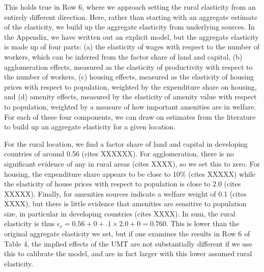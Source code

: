 \documentclass[10pt]{article}
\begin{document}
This holds true in Row 6, where we approach setting the rural elasticity from an entirely different direction. Here, rather than starting with an aggregate estimate of the elasticity, we build up the aggregate elasticity from underlying sources. In the Appendix, we have written out an explicit model, but the aggregate elasticity is made up of four parts: (a) the elasticity of wages with respect to the number of workers, which can be inferred from the factor share of land and capital, (b) agglomeration effects, measured as the elasticity of productivity with respect to the number of workers, (c) housing effects, measured as the elasticity of housing prices with respect to population, weighted by the expenditure share on housing, and (d) amenity effects, measured by the elasticity of amenity value with respect to population, weighted by a measure of how important amenities are in welfare. For each of these four components, we can draw on estimates from the literature to build up an aggregate elasticity for a given location.

For the rural location, we find a factor share of land and capital in developing countries of around 0.56 (cites XXXXXX). For agglomeration, there is no significant evidence of any in rural areas (cites XXXX), so we set this to zero. For housing, the expenditure share appears to be close to 10\% (cites XXXXX) while the elasticity of house prices with respect to population is close to 2.0 (cites XXXXX). Finally, for amenities sources indicate a welfare weight of 0.1 (cites XXXX), but there is little evidence that amenities are sensitive to population size, in particular in developing countries (cites XXXX). In sum, the rural elasticity is thus $\epsilon_r = 0.56 + 0 + .1\times2.0 + 0 = 0.760$. This is lower than the original aggregate elasticity we set, but if one examines the results in Row 6 of Table 4, the implied effects of the UMT are not substantially different if we use this to calibrate the model, and are in fact larger with this lower assumed rural elasticity. 
\end{document}
